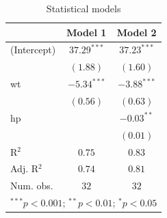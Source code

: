 
\begin{table}
\begin{center}
\begin{tabular}{l c c}
\hline
 & Model 1 & Model 2 \\
\hline
(Intercept) & $37.29^{***}$ & $37.23^{***}$ \\
            & $(1.88)$      & $(1.60)$      \\
wt          & $-5.34^{***}$ & $-3.88^{***}$ \\
            & $(0.56)$      & $(0.63)$      \\
hp          &               & $-0.03^{**}$  \\
            &               & $(0.01)$      \\
\hline
R$^2$       & $0.75$        & $0.83$        \\
Adj. R$^2$  & $0.74$        & $0.81$        \\
Num. obs.   & $32$          & $32$          \\
\hline
\multicolumn{3}{l}{\scriptsize{$^{***}p<0.001$; $^{**}p<0.01$; $^{*}p<0.05$}}
\end{tabular}
\caption{Statistical models}
\label{table:coefficients}
\end{center}
\end{table}
